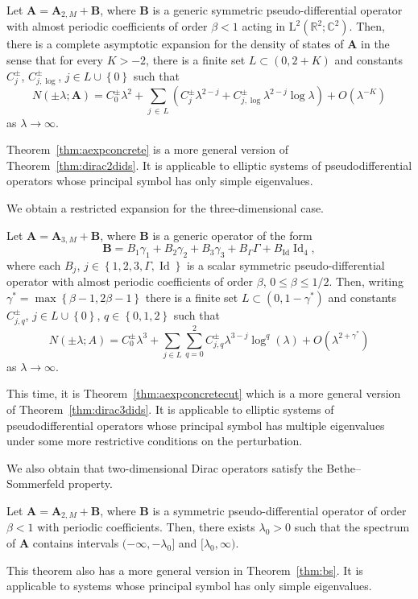 \documentclass[AHL,Unicode,longabstracts,published]{cedram}
\DeclareMathOperator{\Id}{Id}
\newcommand{\RL}{\mathrm{L}}
\newcommand{\R}{\mathbb R}
\newcommand{\C}{\mathbb C}
\newcommand{\BA}{\mathbf A}
\newcommand{\BB}{\mathbf B}
\newcommand{\bigo}[1]{O\left(#1 \right)}
\newcommand{\set}[1]{\left\{ #1 \right\}}
\begin{document}
\begin{theo}\label{thm:dirac2dids}
Let $\BA = \BA_{2,M} + \BB$, where $\BB$ is a generic symmetric pseudo-differential operator with almost periodic coefficients of order $\beta < 1$ acting in $\RL^2(\R^2;\C^2)$. Then, there is a complete asymptotic expansion for the density of states of $\BA$ in the sense that for every $K > -2$, there is a finite set $L \subset (0,2+K)$ and constants $C_{j}^\pm$, $C_{j,\log}^\pm$, $j \in L \cup \set 0$ such that
\begin{equation}
N(\pm\lambda;\BA) = C_0^\pm \lambda^2 + \sum_{j\,\in\,L}\left(C_{j}^\pm
\lambda^{2 - j} + C_{j,\log}^\pm \lambda^{2-j} \log \lambda \right)+ \bigo{\lambda^{-K}}
\end{equation}
as $\lambda \to \infty$.
\end{theo}
Theorem~\ref{thm:aexpconcrete} is a more general version of Theorem~\ref{thm:dirac2dids}. It is applicable to elliptic systems of pseudodifferential operators whose principal symbol has only simple eigenvalues.

We obtain a restricted expansion for the three-dimensional case.
\begin{theo}\label{thm:dirac3dids}
Let $\BA = \BA_{3,M} + \BB$, where $\BB$ is a generic operator of the form
\[
\BB = B_1 \gamma_1 + B_2 \gamma_2 + B_3 \gamma_3 + B_\Gamma \Gamma + B_{\Id}
\Id_4,
\]
where each $B_j$, $j \in\set{1,2,3,\Gamma,\Id}$ is a scalar symmetric pseudo-differential operator with almost periodic coefficients of order $\beta$, $0 \le \beta \le 1/2$. Then, writing $\gamma^* = \max \set{\beta - 1, 2 \beta - 1}$ there is a finite set $L \subset (0,1 - \gamma^*)$ and constants $C_{j,q}^\pm$, $j \in L \cup \set{0}$, $q \in \set{0,1,2}$ such that
\begin{equation}
N(\pm\lambda;A) = C_0^\pm \lambda^3 + \sum_{j \in L} \sum_{q = 0}^2 C_{j,q}^\pm
\lambda^{3 - j} \log^q(\lambda) + \bigo{\lambda^{2 +
\gamma^*}}
\end{equation}
as $\lambda \to \infty$.
\end{theo}
This time, it is Theorem~\ref{thm:aexpconcretecut} which is a more general version of Theorem~\ref{thm:dirac3dids}. It is applicable to elliptic systems of pseudodifferential operators whose principal symbol has multiple eigenvalues under some more restrictive conditions on the perturbation.

We also obtain that two-dimensional Dirac operators satisfy the Bethe--Sommerfeld property.
\begin{theo}\label{thm:dirac2dbs}
Let $\BA = \BA_{2,M} + \BB$, where $\BB$ is a symmetric pseudo-differential operator of order $\beta < 1$ with periodic coefficients. Then, there exists $\lambda_0 > 0$ such that the spectrum of $\BA$ contains intervals $(-\infty,-\lambda_0]$ and $[\lambda_0,\infty)$.
\end{theo} 
This theorem also has a more general version in Theorem~\ref{thm:bs}. It is applicable to systems whose principal symbol has only simple eigenvalues.
\end{document}
